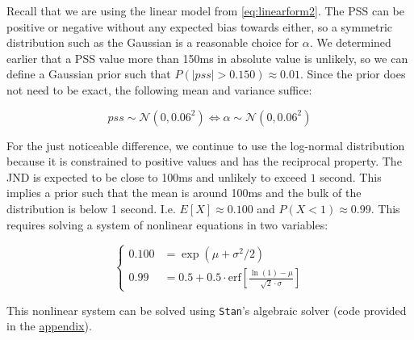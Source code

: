 \documentclass[11pt, oneside, openany]{scrbook}
\newenvironment{Shaded}{\begin{snugshade}}{\end{snugshade}}
\newcommand{\CommentTok}[1]{\textcolor[rgb]{0.56,0.35,0.01}{\textit{#1}}}
\newcommand{\DataTypeTok}[1]{\textcolor[rgb]{0.13,0.29,0.53}{#1}}
\newcommand{\DecValTok}[1]{\textcolor[rgb]{0.00,0.00,0.81}{#1}}
\newcommand{\KeywordTok}[1]{\textcolor[rgb]{0.13,0.29,0.53}{\textbf{#1}}}
\newcommand{\NormalTok}[1]{#1}
\newcommand{\OperatorTok}[1]{\textcolor[rgb]{0.81,0.36,0.00}{\textbf{#1}}}
\newcommand{\StringTok}[1]{\textcolor[rgb]{0.31,0.60,0.02}{#1}}
\begin{document}
Recall that we are using the linear model from \eqref{eq:linearform2}. The PSS can be positive or negative without any expected bias towards either, so a symmetric distribution such as the Gaussian is a reasonable choice for \(\alpha\). We determined earlier that a PSS value more than 150ms in absolute value is unlikely, so we can define a Gaussian prior such that \(P(|pss| > 0.150) \approx 0.01\). Since the prior does not need to be exact, the following mean and variance suffice:

\[
pss \sim \mathcal{N}(0, 0.06^2) \Longleftrightarrow \alpha \sim \mathcal{N}(0, 0.06^2)
\]

For the just noticeable difference, we continue to use the log-normal distribution because it is constrained to positive values and has the reciprocal property. The JND is expected to be close to 100ms and unlikely to exceed \(1\) second. This implies a prior such that the mean is around 100ms and the bulk of the distribution is below 1 second. I.e. \(E[X] \approx 0.100\) and \(P(X < 1) \approx 0.99\). This requires solving a system of nonlinear equations in two variables:


\[
\begin{cases}
0.100 &= \exp\left(\mu + \sigma^2 / 2\right) \\
0.99 &= 0.5 + 0.5 \cdot \mathrm{erf}\left[\frac{\ln (1) - \mu}{\sqrt{2} \cdot \sigma}\right]
\end{cases}
\]

This nonlinear system can be solved using \texttt{Stan}'s algebraic solver (code provided in the \protect\hyperlink{code}{appendix}).


\begin{Shaded}
\end{Shaded}
\end{document}

